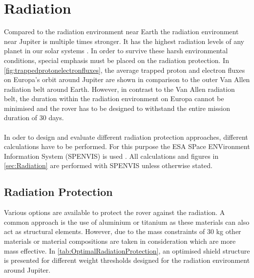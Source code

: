 \clearpage

\section{Radiation}
\label{sec:Radiation}

Compared to the radiation environment near Earth the radiation environment near Jupiter is multiple times stronger. It has the highest radiation levels of any planet in our solar systems \cite{Platzhalter}. In order to survive these harsh environmental conditions, special emphasis must be placed on the radiation protection. In \autoref{fig:trappedprotonelectronfluxes}, the average trapped proton and electron fluxes on Europa's orbit around Jupiter are shown in comparison to the outer Van Allen radiation belt around Earth. However, in contrast to the Van Allen radiation belt, the duration within the radiation environment on Europa cannot be minimised and the rover has to be designed to withstand the entire mission duration of 30 days. \\ \\
In oder to design and evaluate different radiation protection approaches, different calculations have to be performed. For this purpose the ESA SPace ENVironment Information System (SPENVIS) is used \cite{Platzhalter}. All calculations and figures in \autoref{sec:Radiation} are performed with SPENVIS unless otherwise stated.

\subsection{Radiation Protection}

Various options are available to protect the rover against the radiation. A common approach is the use of aluminium or titanium as these materials can also act as structural elements. However, due to the mass constraints of 30 kg other materials or material compositions are taken in consideration which are more mass effective. In \autoref{tab:OptimalRadiationProtection}, an optimised shield structure is presented for different weight thresholds designed for the radiation environment around Jupiter.

